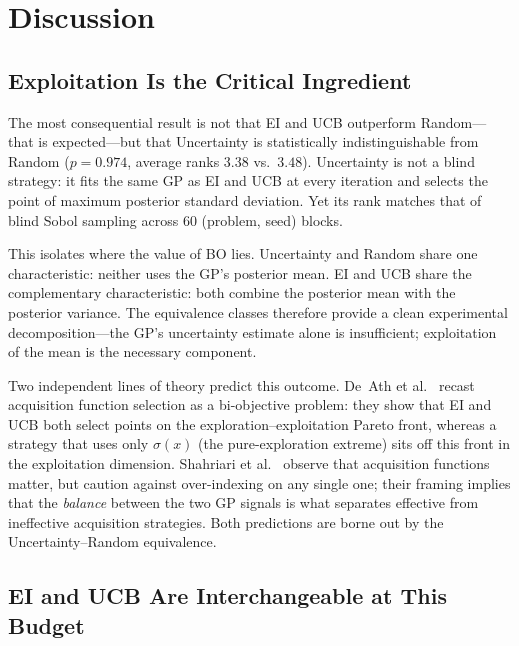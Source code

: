 \section{Discussion}
\label{sec:discussion}

\subsection{Exploitation Is the Critical Ingredient}
\label{sec:exploitation}

The most consequential result is not that EI and UCB outperform Random—
that is expected—but that Uncertainty is statistically indistinguishable
from Random ($p = 0.974$, average ranks $3.38$ vs.\ $3.48$).
Uncertainty is not a blind strategy: it fits the same GP as EI and UCB
at every iteration and selects the point of maximum posterior standard
deviation.
Yet its rank matches that of blind Sobol sampling across 60
(problem, seed) blocks.

This isolates where the value of BO lies.
Uncertainty and Random share one characteristic: neither uses the GP's
posterior mean.
EI and UCB share the complementary characteristic: both combine the
posterior mean with the posterior variance.
The equivalence classes therefore provide a clean experimental
decomposition—the GP's uncertainty estimate alone is insufficient;
exploitation of the mean is the necessary component.

Two independent lines of theory predict this outcome.
De~Ath et al.~\citeyear{deAth2019greed} recast acquisition function
selection as a bi-objective problem: they show that EI and UCB both
select points on the exploration–exploitation Pareto front, whereas a
strategy that uses only $\sigma(x)$ (the pure-exploration extreme) sits
off this front in the exploitation dimension.
Shahriari et al.~\citeyear{shahriari2016taking} observe that acquisition
functions matter, but caution against over-indexing on any single one;
their framing implies that the \emph{balance} between the two GP signals
is what separates effective from ineffective acquisition strategies.
Both predictions are borne out by the Uncertainty–Random equivalence.

\subsection{EI and UCB Are Interchangeable at This Budget}
\label{sec:ei-ucb}

